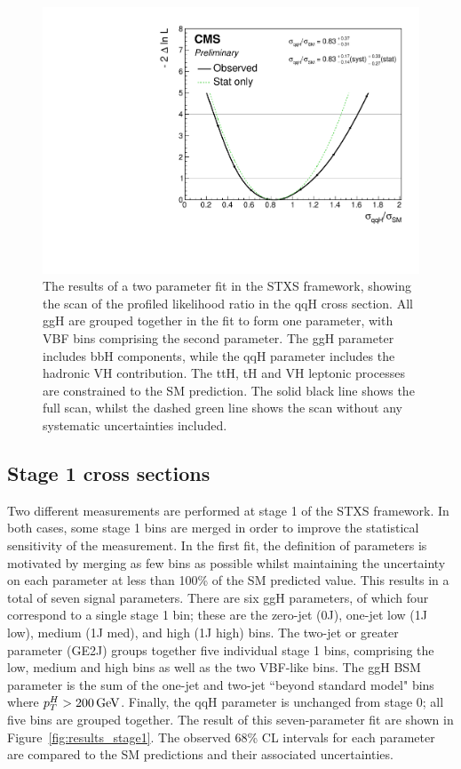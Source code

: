 \begin{figure}[hptb]
\centering
\includegraphics[width=\textwidth]{Figures/Results/ObsStage0_r_qqH.pdf}
\caption{
  The results of a two parameter fit in the STXS framework,
  showing the scan of the profiled likelihood ratio in the qqH cross section.
  All ggH are grouped together in the fit to form one parameter, 
  with VBF bins comprising the second parameter.
  The ggH parameter includes bbH components, 
  while the qqH parameter includes the hadronic VH contribution. 
  The ttH, tH and VH leptonic processes are constrained to the SM prediction. 
  The solid black line shows the full scan, 
  whilst the dashed green line shows the scan without any systematic uncertainties included.
}
\label{fig:results_Stage0_qqH}
\end{figure}

\subsection{Stage 1 cross sections}

Two different measurements are performed at stage 1 of the STXS framework.
In both cases, some stage 1 bins are merged 
in order to improve the statistical sensitivity of the measurement.
In the first fit, the definition of parameters is motivated by merging as few bins as possible
whilst maintaining the uncertainty on each parameter at less than 100\% of the SM predicted value.
This results in a total of seven signal parameters.
There are six ggH parameters, of which four correspond to a single stage 1 bin;
these are the zero-jet (0J), one-jet low (1J low), medium (1J med), and high (1J high) \ptH bins.
The two-jet or greater parameter (GE2J) groups together five individual stage 1 bins, 
comprising the low, medium and high \ptH bins as well as the two VBF-like bins.
The ggH BSM parameter is the sum of the one-jet and two-jet ``beyond standard model" bins
where $p_T^H > \SI{200}{GeV}$.
Finally, the qqH parameter is unchanged from stage 0;
all five bins are grouped together.
The result of this seven-parameter fit are shown in Figure~\ref{fig:results_stage1}. 
The observed 68\% CL intervals for each parameter are compared 
to the SM predictions and their associated uncertainties.

